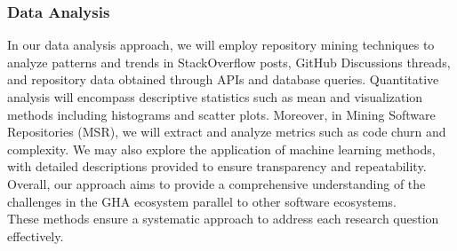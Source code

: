 \documentclass[conference]{IEEEtran}
\begin{document}
        \subsubsection{\textbf{Data Analysis}}

            In our data analysis approach, we will employ repository mining techniques to analyze patterns and trends in StackOverflow posts, GitHub Discussions threads, and repository data obtained through APIs and database queries. Quantitative analysis will encompass descriptive statistics such as mean and visualization methods including histograms and scatter plots. Moreover, in Mining Software Repositories (MSR), we will extract and analyze metrics such as code churn and complexity. We may also explore the application of machine learning methods, with detailed descriptions provided to ensure transparency and repeatability. Overall, our approach aims to provide a comprehensive understanding of the challenges in the GHA ecosystem parallel to other software ecosystems.\\

        These methods ensure a systematic approach to address each research question effectively.\\
\end{document}
